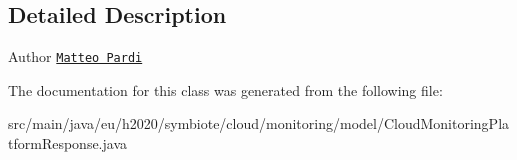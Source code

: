 \subsection{Detailed Description}
\begin{DoxyAuthor}{Author}
\href{mailto:m.pardi@nextworks.it}{\tt Matteo Pardi} 
\end{DoxyAuthor}


The documentation for this class was generated from the following file\+:\begin{DoxyCompactItemize}
\item 
src/main/java/eu/h2020/symbiote/cloud/monitoring/model/Cloud\+Monitoring\+Platform\+Response.\+java\end{DoxyCompactItemize}
